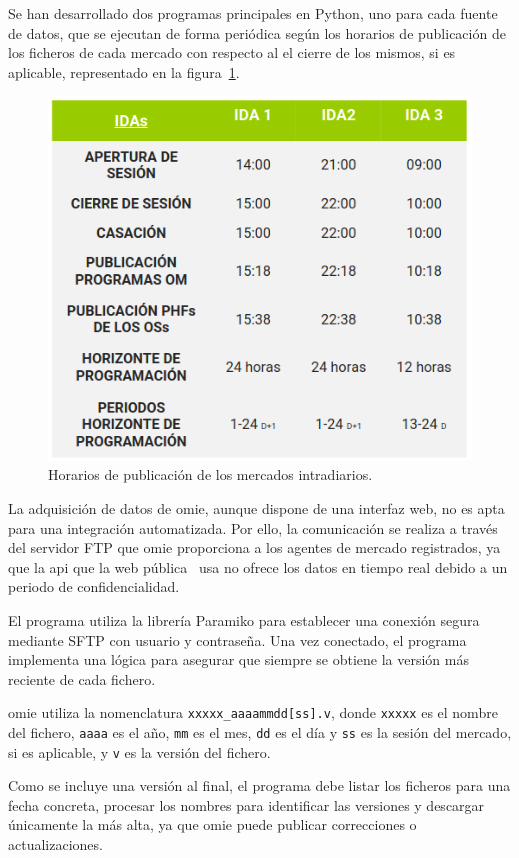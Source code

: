 Se han desarrollado dos programas principales en Python, uno para cada fuente de datos, que se ejecutan de forma periódica según los horarios de publicación de los ficheros de cada mercado con respecto al el cierre de los mismos, si es aplicable, representado en la figura~\ref{fig:horarios-publicacion}.

\begin{figure}
  \centering
  \includegraphics[width=0.5\linewidth]{figures/horarios-publicacion.png}
  \caption[Horarios de publicación de mercados intradiarios.]{Horarios de publicación de los mercados intradiarios.}%
  \label{fig:horarios-publicacion}
\end{figure}

La adquisición de datos de \gls{omie}, aunque dispone de una interfaz web, no es apta para una integración automatizada. Por ello, la comunicación se realiza a través del servidor FTP que \gls{omie} proporciona a los agentes de mercado registrados, ya que la \gls{api} que la web pública~\cite{omie2025acceso} usa no ofrece los datos en tiempo real debido a un periodo de confidencialidad.

El programa utiliza la librería Paramiko para establecer una conexión segura mediante SFTP con usuario y contraseña. Una vez conectado, el programa implementa una lógica para asegurar que siempre se obtiene la versión más reciente de cada fichero.

\Gls{omie} utiliza la nomenclatura \texttt{xxxxx\_aaaammdd[ss].v}, donde \texttt{xxxxx} es el nombre del fichero, \texttt{aaaa} es el año, \texttt{mm} es el mes, \texttt{dd} es el día y \texttt{ss} es la sesión del mercado, si es aplicable, y \texttt{v} es la versión del fichero.

Como se incluye una versión al final, el programa debe listar los ficheros para una fecha concreta, procesar los nombres para identificar las versiones y descargar únicamente la más alta, ya que \gls{omie} puede publicar correcciones o actualizaciones.

